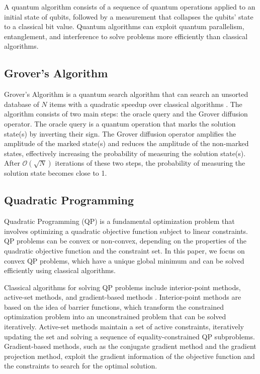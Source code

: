 A quantum algorithm consists of a sequence of quantum operations applied to an initial state of qubits, followed by a measurement that collapses the qubits' state to a classical bit value. Quantum algorithms can exploit quantum parallelism, entanglement, and interference to solve problems more efficiently than classical algorithms.

\subsection{Grover's Algorithm}

Grover's Algorithm is a quantum search algorithm that can search an unsorted database of $N$ items with a quadratic speedup over classical algorithms \cite{grover1996fast}. The algorithm consists of two main steps: the oracle query and the Grover diffusion operator. The oracle query is a quantum operation that marks the solution state(s) by inverting their sign. The Grover diffusion operator amplifies the amplitude of the marked state(s) and reduces the amplitude of the non-marked states, effectively increasing the probability of measuring the solution state(s). After $\mathcal{O}(\sqrt{N})$ iterations of these two steps, the probability of measuring the solution state becomes close to 1.

\subsection{Quadratic Programming}

Quadratic Programming (QP) is a fundamental optimization problem that involves optimizing a quadratic objective function subject to linear constraints. QP problems can be convex or non-convex, depending on the properties of the quadratic objective function and the constraint set. In this paper, we focus on convex QP problems, which have a unique global minimum and can be solved efficiently using classical algorithms.

Classical algorithms for solving QP problems include interior-point methods, active-set methods, and gradient-based methods \cite{nocedal2006numerical}. Interior-point methods are based on the idea of barrier functions, which transform the constrained optimization problem into an unconstrained problem that can be solved iteratively. Active-set methods maintain a set of active constraints, iteratively updating the set and solving a sequence of equality-constrained QP subproblems. Gradient-based methods, such as the conjugate gradient method and the gradient projection method, exploit the gradient information of the objective function and the constraints to search for the optimal solution.

